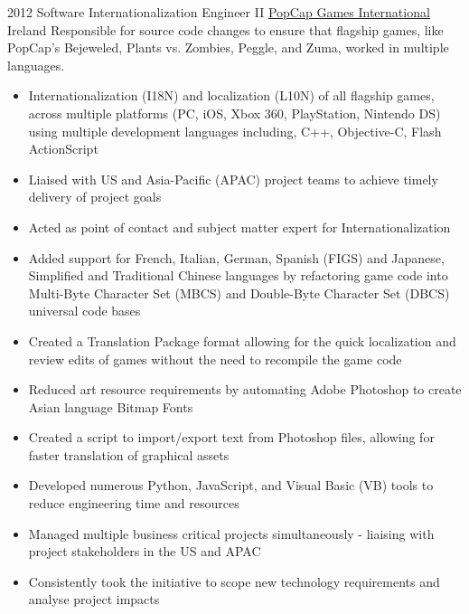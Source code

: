 
\begin{twenty}
  {2012}
  {Software Internationalization Engineer II}
  {\href{https://www.popcap.com/}{PopCap Games International}}
  {Ireland}
  {Responsible for source code changes to ensure that flagship games, like PopCap's Bejeweled, Plants vs. Zombies, Peggle, and Zuma, worked in multiple languages.}
  {\begin{itemize}
    \item Internationalization (I18N) and localization (L10N) of all flagship games, across multiple platforms (PC, iOS, Xbox 360, PlayStation, Nintendo DS) using multiple development languages including, C++, Objective-C, Flash ActionScript
    \item Liaised with US and Asia-Pacific (APAC) project teams to achieve timely delivery of project goals
    \item Acted as point of contact and subject matter expert for Internationalization
  \end{itemize}
  }
  {\begin{itemize}
    \item Added support for French, Italian, German, Spanish (FIGS) and Japanese, Simplified and Traditional Chinese languages by refactoring game code into Multi-Byte Character Set (MBCS) and Double-Byte Character Set (DBCS) universal code bases
    \item Created a Translation Package format allowing for the quick localization and review edits of games without the need to recompile the game code
    \item Reduced art resource requirements by automating Adobe Photoshop to create Asian language Bitmap Fonts
    \item Created a script to import/export text from Photoshop files, allowing for faster translation of graphical assets
    \item Developed numerous Python, JavaScript, and Visual Basic (VB) tools to reduce engineering time and resources
    \item Managed multiple business critical projects simultaneously - liaising with project stakeholders in the US and APAC
    \item Consistently took the initiative to scope new technology requirements and analyse project impacts
  \end{itemize}
  }
\end{twenty}

